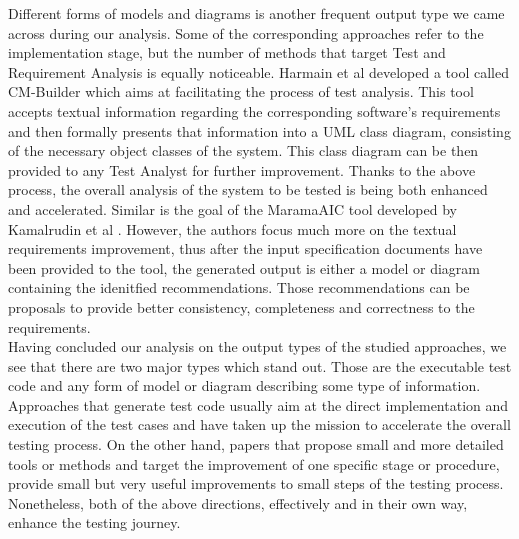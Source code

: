 Different forms of models and diagrams is another frequent output type we came across during our analysis. Some of the corresponding approaches refer to the implementation stage, but the number of methods 
that target Test and Requirement Analysis is equally noticeable. Harmain et al \cite{harmain2000cm} developed a tool called CM-Builder which aims at facilitating the process of test analysis. This tool 
accepts textual information regarding the corresponding software's requirements and then formally presents that information into a UML class diagram, consisting of the necessary object classes of the system. 
This class diagram can be then provided to any Test Analyst for further improvement. Thanks to the above process, the overall analysis of the system to be tested is being both enhanced and accelerated. 
Similar is the goal of the MaramaAIC tool developed by Kamalrudin et al \cite{kamalrudin2017maramaaic}. However, the authors focus much more on the textual requirements improvement, thus after the input 
specification documents have been provided to the tool, the generated output is either a model or diagram containing the idenitfied recommendations. Those recommendations can be proposals to provide better consistency, 
completeness and correctness to the requirements.\\

Having concluded our analysis on the output types of the studied approaches, we see that there are two major types which stand out. Those are the executable test code and any form of model or diagram describing 
some type of information. Approaches that generate test code usually aim at the direct implementation and execution of the test cases and have taken up the mission to accelerate the overall testing process. On the 
other hand, papers that propose small and more detailed tools or methods and target the improvement of one specific stage or procedure, provide small but very useful improvements to small steps of the testing process. 
Nonetheless, both of the above directions, effectively and in their own way, enhance the testing journey.

